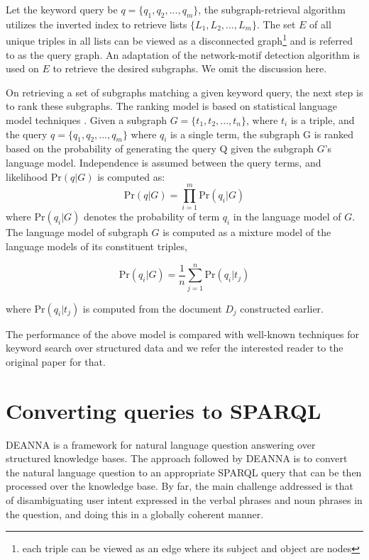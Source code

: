 \documentclass[a4paper, twoside, 12pt]{report}
\begin{document}
 Let the keyword query be $q = \{q_1, q_2, ..., q_m\}$, the subgraph-retrieval algorithm utilizes the inverted index to retrieve lists $\{L_1, L_2, ..., L_m\}$. The set $E$ of all unique triples in all lists can be viewed as a disconnected graph\footnote{each triple can be viewed as an edge where its subject  and object are nodes} and is referred to as the query graph. An adaptation of the network-motif detection algorithm \cite{wernicke2005faster} is used on $E$ to retrieve the desired subgraphs. We omit the discussion here.
 
 On retrieving a set of subgraphs matching a given keyword query, the next step is to rank these subgraphs. The ranking model is based on statistical language model techniques \cite{ponte1998language}. Given a subgraph $G = \{t_1, t_2, ..., t_n\}$, where $t_i$ is a triple, and the query $q = \{q_1, q_2, ..., q_m\}$ where $q_i$ is a single term, the subgraph G  is ranked based on the probability of generating the query Q given the subgraph $G$'s language model. Independence is assumed between the query terms, and likelihood $\text{Pr}(q|G)$ is computed as:
 $$ \text{Pr}(q|G) = \prod_{i=1}^{m} \text{Pr}(q_i|G)$$
 where $\text{Pr}(q_i|G)$ denotes the probability of term $q_i$ in the language model of $G$. The language model of subgraph $G$ is computed as a mixture model of the language models of its constituent triples, 
 
 $$ \text{Pr}(q_i|G) = \frac{1}{n} \sum_{j=1}^{n} \text{Pr}(q_i|t_j)$$

 where $\text{Pr}(q_i | t_j)$ is computed from the document $D_j$ constructed earlier.
 
 The performance of the above model is compared with well-known techniques for keyword search over structured data \cite{bhalotia2002keyword, nie2007web} and we refer the interested reader to the original paper \cite{elbassuoni2011keyword} for that.
 
 
\section{Converting queries to SPARQL}

DEANNA \cite{yahya2012deep} is a framework for natural language question answering over structured knowledge bases. The approach followed by DEANNA is to convert the natural language question to an appropriate SPARQL query that can be then processed over the knowledge base. By far, the main challenge addressed is that of disambiguating user intent expressed in the verbal phrases and noun phrases in the question, and doing this in a globally coherent manner.
\end{document}
